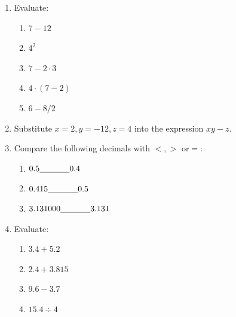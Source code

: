 \documentclass[12pt]{article}
\newcommand{\blk}{\underline{\hspace{0.5in}}}
\begin{document}
{}
\begin{enumerate}
	\item Evaluate:
	\begin{enumerate}
		\item $7 - 12$
		\item $4^2$
		\item $7-2\cdot 3$
		\item $4\cdot(7-2)$
		\item $6- 8/2$
	\end{enumerate}
	\item Substitute $x=2, y=-12, z=4$ into the expression $xy - z$.
	\item Compare the following decimals with $<, >$ or$ =$:
	\begin{enumerate}
		\item $0.5 \blk{} 0.4$
		\item $0.415 \blk 0.5$
		\item $3.131000 \blk 3.131$
	\end{enumerate}
	\item Evaluate:
	\begin{enumerate}
		\item $3.4 + 5.2$
		\item $2.4 + 3.815$
		\item $9.6 - 3.7$
		\item $15.4 \div 4$
	\end{enumerate}

\end{enumerate}
\end{document}
